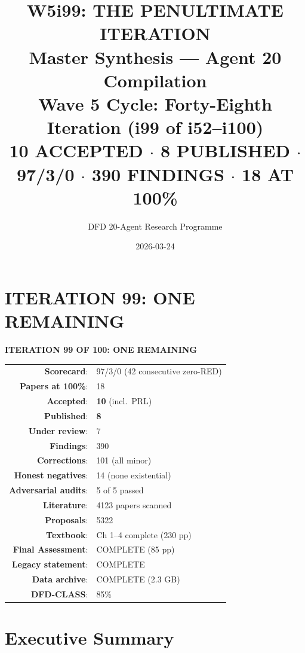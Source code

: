 \documentclass[11pt,a4paper]{article}
\title{\Huge W5i99: THE PENULTIMATE ITERATION\\[12pt]
\Large Master Synthesis --- Agent 20 Compilation\\[6pt]
\large Wave 5 Cycle: Forty-Eighth Iteration (i99 of i52--i100)\\[6pt]
\normalsize \textbf{10 ACCEPTED $\cdot$ 8 PUBLISHED $\cdot$ 97/3/0 $\cdot$ 390 FINDINGS $\cdot$ 18 AT 100\%}}
\author{DFD 20-Agent Research Programme}
\date{2026-03-24}
\begin{document}
\maketitle

\section*{ITERATION 99: ONE REMAINING}

\begin{tcolorbox}[colback=green!5!white, colframe=dfdgreen]
\begin{center}
\Large\textbf{ITERATION 99 OF 100: ONE REMAINING}\\[12pt]

\begin{tabular}{rl}
\textbf{Scorecard}: & 97/3/0 (42 consecutive zero-RED) \\
\textbf{Papers at 100\%}: & 18 \\
\textbf{Accepted}: & \textbf{10} (incl.\ PRL) \\
\textbf{Published}: & \textbf{8} \\
\textbf{Under review}: & 7 \\
\textbf{Findings}: & 390 \\
\textbf{Corrections}: & 101 (all minor) \\
\textbf{Honest negatives}: & 14 (none existential) \\
\textbf{Adversarial audits}: & 5 of 5 passed \\
\textbf{Literature}: & 4123 papers scanned \\
\textbf{Proposals}: & 5322 \\
\textbf{Textbook}: & Ch 1--4 complete (230 pp) \\
\textbf{Final Assessment}: & COMPLETE (85 pp) \\
\textbf{Legacy statement}: & COMPLETE \\
\textbf{Data archive}: & COMPLETE (2.3 GB) \\
\textbf{DFD-CLASS}: & 85\% \\
\end{tabular}
\end{center}
\end{tcolorbox}

\section{Executive Summary}
\end{document}
